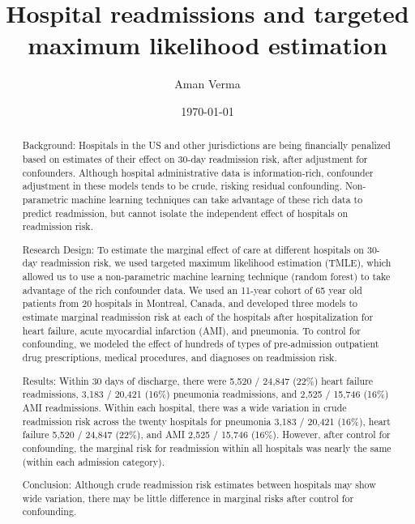 \documentclass[]{article}\usepackage[]{graphicx}\usepackage[]{color}
\begin{document}
\title{Hospital readmissions and targeted maximum likelihood estimation}
\author{Aman Verma}
\date{\today}

\begin{abstract}






Background: Hospitals in the US and other jurisdictions are being financially penalized based on estimates of their effect on 30-day readmission risk, after adjustment for confounders. Although hospital administrative data is information-rich, confounder adjustment in these models tends to be crude, risking residual confounding. Non-parametric machine learning techniques can take advantage of these rich data to predict readmission, but cannot isolate the independent effect of hospitals on readmission risk.

Research Design: To estimate the marginal effect of care at different hospitals on 30-day readmission risk, we used targeted maximum likelihood estimation (TMLE), which allowed us to use a non-parametric machine learning technique (random forest) to take advantage of the rich confounder data. We used an 11-year cohort of 65 year old patients from 20 hospitals in Montreal, Canada, and developed three models to estimate marginal readmission risk at each of the hospitals after hospitalization for heart failure, acute myocardial infarction (AMI), and pneumonia. To control for confounding, we modeled the effect of hundreds of types of pre-admission outpatient drug prescriptions, medical procedures, and diagnoses on readmission risk.

Results: Within 30 days of discharge, there were 5,520 / 24,847 (22\%) heart failure readmissions, 3,183 / 20,421 (16\%) pneumonia readmissions, and 2,525 / 15,746 (16\%) AMI readmissions. Within each hospital, there was a wide variation in crude readmission risk across the twenty hospitals for pneumonia 3,183 / 20,421 (16\%), heart failure 5,520 / 24,847 (22\%), and AMI 2,525 / 15,746 (16\%). However, after control for confounding, the marginal risk for readmission within all hospitals was nearly the same (within each admission category).

Conclusion: Although crude readmission risk estimates between hospitals may show wide variation, there may be little difference in marginal risks after control for confounding.

\end{abstract}
\end{document}
